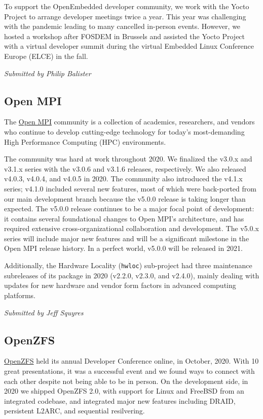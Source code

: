 \documentclass[a4paper]{report}
\begin{document}
To support the OpenEmbedded developer community, we work with the Yocto Project to arrange developer meetings twice a year. This year was challenging with the pandemic leading to many cancelled in-person events. However, we hosted a workshop after FOSDEM in Brussels and assisted the Yocto Project with a virtual developer summit during the virtual Embedded Linux Conference Europe (ELCE) in the fall.

{\em Submitted by Philip Balister}

\subsection{Open MPI}

The \href{https://www.open-mpi.org/}{Open MPI} community is a collection of academics, researchers, and vendors who continue to develop cutting-edge technology for today's most-demanding High Performance Computing (HPC) environments.

The community was hard at work throughout 2020.  We finalized the v3.0.x and v3.1.x series with the v3.0.6 and v3.1.6 releases, respectively.  We also released v4.0.3, v4.0.4, and v4.0.5 in 2020.  The community also introduced the v4.1.x series; v4.1.0 included several new features, most of which were back-ported from our main development branch because the v5.0.0 release is taking longer than expected.  The v5.0.0 release continues to be a major focal point of development: it contains several foundational changes to Open MPI's architecture, and has required extensive cross-organizational collaboration and development.  The v5.0.x series will include major new features and will be a significant milestone in the Open MPI release history.  In a perfect world, v5.0.0 will be released in 2021.

Additionally, the Hardware Locality (\texttt{hwloc}) sub-project had three maintenance subreleases of its package in 2020 (v2.2.0, v2.3.0, and v2.4.0), mainly dealing with updates for new hardware and vendor form factors in advanced computing platforms.

{\em Submitted by Jeff Squyres}

\subsection{OpenZFS}

\href{https://openzfs.org/}{OpenZFS} held its annual Developer Conference online, in October, 2020.  With 10 great presentations, it was a successful event and we found ways to connect with each other despite not being able to be in person.  On the development side, in 2020 we shipped OpenZFS 2.0, with support for Linux and FreeBSD from an integrated codebase, and integrated major new features including DRAID, persistent L2ARC, and sequential resilvering.
\end{document}
